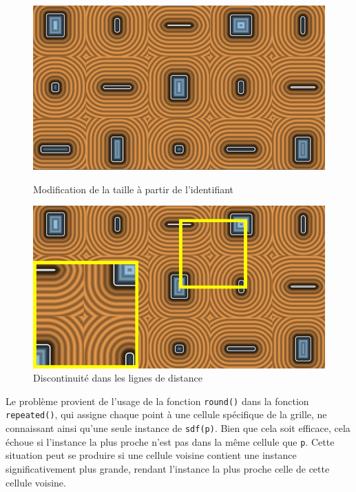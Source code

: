 \begin{figure}[h]
  \begin{minipage}[b]{0.45\linewidth}
    \centering
    \includegraphics[width=\linewidth]{images/sdf/repet03.png}
    \caption{Modification de la taille à partir de l'identifiant}
    \label{repet03}
  \end{minipage}
  \hspace{0.1\linewidth} %
  \begin{minipage}[b]{0.45\linewidth}
    \centering
    \includegraphics[width=\linewidth]{images/sdf/repet04.png}
    \caption{Discontinuité dans les lignes de distance}
    \label{repet04}
  \end{minipage}
\end{figure}

Le problème provient de l'usage de la fonction \lstinline{round()} dans la fonction \lstinline{repeated()}, qui assigne chaque point à une cellule spécifique de la grille, ne connaissant ainsi qu'une seule instance de \lstinline{sdf(p)}. Bien que cela soit efficace, cela échoue si l'instance la plus proche n'est pas dans la même cellule que \lstinline{p}. Cette situation peut se produire si une cellule voisine contient une instance significativement plus grande, rendant l'instance la plus proche celle de cette cellule voisine.

